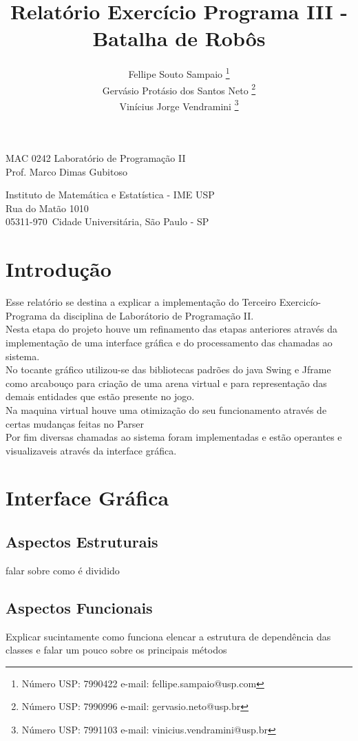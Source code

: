 \documentclass[a4paper]{article}
\title{Relatório Exercício Programa III - Batalha de Robôs}
\author{
Fellipe Souto Sampaio \footnote{Número USP: 7990422 e-mail: fellipe.sampaio@usp.com}\\
Gervásio Protásio dos Santos Neto \footnote{Número USP: 7990996 e-mail: gervasio.neto@usp.br}\\
Vinícius Jorge Vendramini \footnote{Número USP: 7991103 e-mail: vinicius.vendramini@usp.br}
}
\begin{document}
\maketitle

\begin{center}
MAC 0242 Laboratório de Programa\c{c}ão II \\
Prof. Marco Dimas Gubitoso \\
             
\end{center}

\begin{center}
Instituto de Matemática e Estatística - IME USP \\
 Rua do Matão 1010 \\
 05311-970\, Cidade Universitária, São Paulo - SP \\
\end{center}

\newpage

\section{Introdução}

Esse relatório se destina a explicar a implementação do Terceiro Exercicío-Programa da disciplina de Laborátorio de Programação II.\\
Nesta etapa do projeto houve um refinamento das etapas anteriores através da implementação de uma interface gráfica e do processamento das chamadas ao sistema.\\
No tocante gráfico utilizou-se das bibliotecas padrões do java Swing e Jframe como arcabouço para criação de uma arena virtual e para representação das demais entidades que estão presente no jogo.\\
Na maquina virtual houve uma otimização do seu funcionamento através de certas mudanças feitas no Parser\\
Por fim diversas chamadas ao sistema foram implementadas e estão operantes e visualizaveis através da interface gráfica.

\newpage
\section{Interface Gráfica}
\subsection{Aspectos Estruturais}
falar sobre como é dividido
\subsection{Aspectos Funcionais}
Explicar sucintamente como funciona
elencar a estrutura de dependência das classes e falar um pouco sobre os principais métodos
\end{document}

